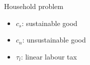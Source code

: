 \documentclass[11pt,aspectratio=169]{beamer}
\begin{document}
\begin{frame}{Household problem}
		\small
		\begin{minipage}[t!]{0.4\textwidth}
			\vspace{7mm}
			\begin{itemize}
				\item[] $c_s$: sustainable good \vspace{-2mm}
				\item[] $c_n$: unsustainable good\vspace{-2mm}
				\item[] $\tau_l$: linear labour tax
			\end{itemize}
		\end{minipage}
		\begin{minipage}[t!]{0.4\textwidth}
			\vspace{7mm}
		\end{minipage}
		
	\end{frame}
	
\end{document}
